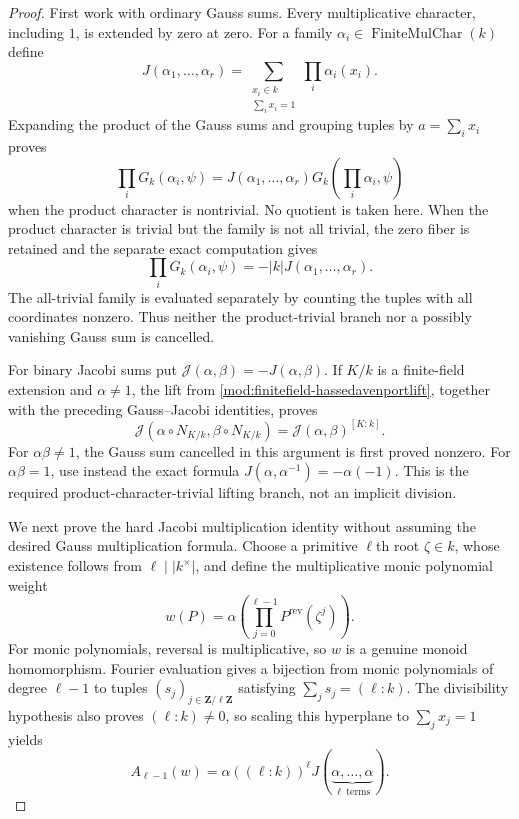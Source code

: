 \begin{proof}
First work with ordinary Gauss sums.  Every multiplicative character,
including $1$, is extended by zero at zero.  For a family
$\alpha_i\in\operatorname{FiniteMulChar}(k)$ define
\[
 J(\alpha_1,\ldots,\alpha_r)
 =\sum_{\substack{x_i\in k\\ \sum_i x_i=1}}
    \prod_i\alpha_i(x_i).
\]
Expanding the product of the Gauss sums and grouping tuples by
$a=\sum_i x_i$ proves
\[
 \prod_iG_k(\alpha_i,\psi)
 =J(\alpha_1,\ldots,\alpha_r)
   G_k\!\left(\prod_i\alpha_i,\psi\right)
\]
when the product character is nontrivial.  No quotient is taken here.
When the product character is trivial but the family is not all trivial,
the zero fiber is retained and the separate exact computation gives
\[
 \prod_iG_k(\alpha_i,\psi)
 =-\lvert k\rvert J(\alpha_1,\ldots,\alpha_r).
\]
The all-trivial family is evaluated separately by counting the tuples with
all coordinates nonzero.  Thus neither the product-trivial branch nor a
possibly vanishing Gauss sum is cancelled.

For binary Jacobi sums put
$\mathcal J(\alpha,\beta)=-J(\alpha,\beta)$.  If $K/k$ is a finite-field
extension and $\alpha\ne1$, the lift from
\ref{mod:finitefield-hassedavenportlift}, together with the preceding
Gauss--Jacobi identities, proves
\[
 \mathcal J(\alpha\circ N_{K/k},\beta\circ N_{K/k})
 =\mathcal J(\alpha,\beta)^{[K:k]}.
\]
For $\alpha\beta\ne1$, the Gauss sum cancelled in this argument is first
proved nonzero.  For $\alpha\beta=1$, use instead the exact formula
$J(\alpha,\alpha^{-1})=-\alpha(-1)$.  This is the required
product-character-trivial lifting branch, not an implicit division.

We next prove the hard Jacobi multiplication identity without assuming the
desired Gauss multiplication formula.  Choose a primitive $\ell$th root
$\zeta\in k$, whose existence follows from
$\ell\mid\lvert k^\times\rvert$, and define the multiplicative monic
polynomial weight
\[
 w(P)=\alpha\!\left(
   \prod_{j=0}^{\ell-1}P^{\mathrm{rev}}(\zeta^j)\right).
\]
For monic polynomials, reversal is multiplicative, so $w$ is a genuine
monoid homomorphism.  Fourier evaluation gives a bijection from monic
polynomials of degree $\ell-1$ to tuples
$(s_j)_{j\in\mathbf Z/\ell\mathbf Z}$ satisfying
$\sum_j s_j=(\ell:k)$.  The divisibility hypothesis also proves
$(\ell:k)\ne0$, so scaling this hyperplane to $\sum_jx_j=1$ yields
\[
 A_{\ell-1}(w)
 =\alpha((\ell:k))^\ell
   J(\underbrace{\alpha,\ldots,\alpha}_{\ell\ \mathrm{terms}}).
\]


\end{proof}
